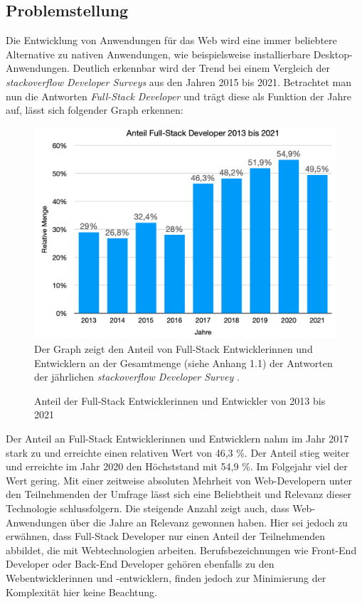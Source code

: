 \documentclass[a4paper]{scrartcl}
\begin{document}
\subsection{Problemstellung}
Die Entwicklung von Anwendungen für das Web wird eine immer beliebtere Alternative zu nativen Anwendungen, wie beispielsweise installierbare Desktop-Anwendungen. Deutlich erkennbar wird der Trend bei einem Vergleich der \textit{stackoverflow Developer Surveys} aus den Jahren 2015 bis 2021. Betrachtet man nun die Antworten \textit{Full-Stack Developer} und trägt diese als Funktion der Jahre auf, lässt sich folgender Graph erkennen: 

\begin{figure}[H]
	\centering
		\caption{Anteil der Full-Stack Entwicklerinnen und Entwickler von 2013 bis 2021}
	\includegraphics[scale=0.28]{_assets/stackoverflow_fullstack_developers.png} \\
	Der Graph zeigt den Anteil von Full-Stack Entwicklerinnen und Entwicklern an der Gesamtmenge (siehe Anhang 1.1) der Antworten der jährlichen \textit{stackoverflow Developer Survey} \autocite{stackoverflow_2015,stackoverflow_2016,stackoverflow_2017,stackoverflow_2018,stackoverflow_2019,stackoverflow_2020,stackoverflow_2021}.  
\end{figure}

Der Anteil an Full-Stack Entwicklerinnen und Entwicklern nahm im Jahr 2017 stark zu und erreichte einen relativen Wert von 46,3 \%. Der Anteil stieg weiter und erreichte im Jahr 2020 den Höchststand mit 54,9 \%. Im Folgejahr viel der Wert gering. Mit einer zeitweise absoluten Mehrheit von Web-Developern unter den Teilnehmenden der Umfrage lässt sich eine Beliebtheit und Relevanz dieser Technologie schlussfolgern. Die steigende Anzahl zeigt auch, dass Web-Anwendungen über die Jahre an Relevanz gewonnen haben. Hier sei jedoch zu erwähnen, dass Full-Stack Developer nur einen Anteil der Teilnehmenden abbildet, die mit Webtechnologien arbeiten. Berufsbezeichnungen wie Front-End Developer oder Back-End Developer gehören ebenfalls zu den Webentwicklerinnen und -entwicklern, finden jedoch zur Minimierung der Komplexität hier keine Beachtung. \\ 
\end{document}

